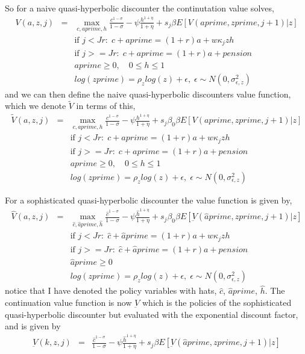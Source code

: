So for a naive quasi-hyperbolic discounter the continutation value solves,
\begin{eqnarray*}
 V(a,z,j)&=& \max_{c,aprime,h} \frac{c^{1-\sigma}}{1-\sigma} - \psi \frac{h^{1+\eta}}{1+\eta}+ s_j \beta E[V(aprime,zprime,j+1)|z] \\
&& \text{if }j<Jr: \; c+aprime=(1+r)a+w \kappa_j z h\\
&& \text{if }j>=Jr: \; c+aprime=(1+r)a +pension\\
&& aprime\geq 0, \quad 0\leq h \leq 1 \\
&& log(zprime)=\rho_z log(z) + \epsilon, \; \epsilon \sim N(0,\sigma_{\epsilon,z}^2)
\end{eqnarray*}
and we can then define the naive quasi-hyperbolic discounters value function, which we denote $\tilde{V}$ in terms of this,
\begin{eqnarray*}
 \tilde{V}(a,z,j)&=& \max_{c,aprime,h} \frac{c^{1-\sigma}}{1-\sigma} - \psi \frac{h^{1+\eta}}{1+\eta} + s_j \beta_0 \beta E[V(aprime,zprime,j+1)|z] \\
&& \text{if }j<Jr: \; c+aprime=(1+r)a+w \kappa_j z h\\
&& \text{if }j>=Jr: \; c+aprime=(1+r)a +pension\\
&& aprime\geq 0, \quad 0\leq h \leq 1 \\
&& log(zprime)=\rho_z log(z) + \epsilon, \; \epsilon \sim N(0,\sigma_{\epsilon,z}^2)
\end{eqnarray*}


For a sophisticated quasi-hyperbolic discounter the value function is given by,
\begin{eqnarray*}
 \hat{V}(a,z,j)&=& \max_{\hat{c},\hat{a}prime,\hat{h}} \frac{\hat{c}^{1-\sigma}}{1-\sigma} - \psi \frac{\hat{h}^{1+\eta}}{1+\eta} + s_j \beta_0 \beta E[\underbar{V}(\hat{a}prime,zprime,j+1)|z] \\
&& \text{if }j<Jr: \; \hat{c}+\hat{a}prime=(1+r)a+w \kappa_j z h\\
&& \text{if }j>=Jr: \; \hat{c}+\hat{a}prime=(1+r)a +pension\\
&& \hat{a}prime\geq 0 \\
&& log(zprime)=\rho_z log(z) + \epsilon, \; \epsilon \sim N(0,\sigma_{\epsilon,z}^2)
\end{eqnarray*}
notice that I have denoted the policy variables with hats, $\hat{c}$, $\hat{a}prime$, $\hat{h}$. The continuation value function is now $\underbar{V}$ which is the policies of the sophisticated quasi-hyperbolic discounter but evaluated with the exponential discount factor, and is given by
\begin{eqnarray*}
 \underbar{V}(k,z,j)&=&\frac{\hat{c}^{1-\sigma}}{1-\sigma}  - \psi \frac{\hat{h}^{1+\eta}}{1+\eta}+ s_j \beta E[ \underbar{V}(\hat{a}prime,zprime,j+1)|z]
\end{eqnarray*}


